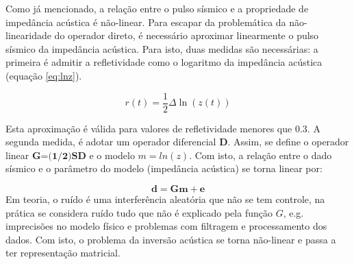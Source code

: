 {Como já mencionado, a relação entre o pulso sísmico e a
propriedade de impedância acústica é não-linear.
Para escapar da problemática da não-linearidade do operador direto, é
necessário aproximar linearmente o pulso sísmico da impedância acústica.
Para isto, duas medidas são necessárias: a primeira é admitir a 
refletividade como o logaritmo da impedância acústica (equação \ref{eq:lnz}).

\begin{equation}
r(t) = \frac{1}{2}\Delta \ln(z(t))
\label{eq:lnz}
\end{equation}

Esta aproximação é válida para valores de refletividade menores que $0.3$.
A segunda medida, é adotar um operador diferencial $\textbf{D}$. Assim,
se define o operador linear $\textbf{G=(1/2)SD}$ e o modelo $m=ln(z)$.
Com isto, a relação entre o dado sísmico e o parâmetro do modelo (impedância acústica)
se torna linear por:

\begin{equation}
\label{eq:sismDiscreta2}
\mathbf{d = Gm + e}
\end{equation}
Em teoria, o ruído é uma interferência aleatória que não se tem
controle, na prática se considera ruído tudo que não é explicado pela função
$G$, e.g. imprecisões no modelo físico e problemas com filtragem e processamento
dos dados. Com isto, o problema da inversão acústica se torna não-linear e passa
a ter representação matricial.

}

